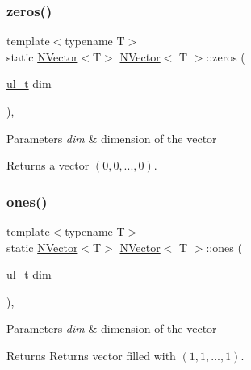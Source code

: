 \mbox{\label{class_n_vector_a6253cef3c39dd9d388bbf7d17069bc51}} 
\subsubsection{\texorpdfstring{zeros()}{zeros()}}
{\footnotesize\ttfamily template$<$typename T$>$ \\
static \mbox{\hyperlink{class_n_vector}{N\+Vector}}$<$T$>$ \mbox{\hyperlink{class_n_vector}{N\+Vector}}$<$ T $>$\+::zeros (\begin{DoxyParamCaption}\item[{\mbox{\hyperlink{typedef_8h_a1b140a2034db3f5dfe18a987745df43a}{ul\+\_\+t}}}]{dim }\end{DoxyParamCaption})\hspace{0.3cm}{\ttfamily [inline]}, {\ttfamily [static]}}


\begin{DoxyParams}{Parameters}
{\em dim} & dimension of the vector \\
\hline
\end{DoxyParams}
\begin{DoxyReturn}{Returns}
a {} vector $ (0, 0, ..., 0) $. 
\end{DoxyReturn}
\mbox{\label{class_n_vector_afb6358454a8dfaac4963352843b17bbc}} 
\subsubsection{\texorpdfstring{ones()}{ones()}}
{\footnotesize\ttfamily template$<$typename T$>$ \\
static \mbox{\hyperlink{class_n_vector}{N\+Vector}}$<$T$>$ \mbox{\hyperlink{class_n_vector}{N\+Vector}}$<$ T $>$\+::ones (\begin{DoxyParamCaption}\item[{\mbox{\hyperlink{typedef_8h_a1b140a2034db3f5dfe18a987745df43a}{ul\+\_\+t}}}]{dim }\end{DoxyParamCaption})\hspace{0.3cm}{\ttfamily [inline]}, {\ttfamily [static]}}


\begin{DoxyParams}{Parameters}
{\em dim} & dimension of the vector \\
\hline
\end{DoxyParams}
\begin{DoxyReturn}{Returns}
Returns vector filled with {} $ (1, 1, ..., 1) $. 
\end{DoxyReturn}
\mbox{\label{class_n_vector_add6abbdea5f58e6887367860aa0f619d}} 
